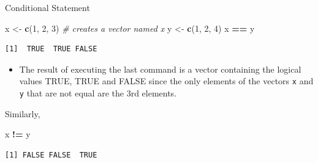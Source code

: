 \documentclass[
  ignorenonframetext,
]{beamer}
\newenvironment{Shaded}{\begin{snugshade}}{\end{snugshade}}
\newcommand{\CommentTok}[1]{\textcolor[rgb]{0.56,0.35,0.01}{\textit{#1}}}
\newcommand{\DecValTok}[1]{\textcolor[rgb]{0.00,0.00,0.81}{#1}}
\newcommand{\FunctionTok}[1]{\textcolor[rgb]{0.13,0.29,0.53}{\textbf{#1}}}
\newcommand{\NormalTok}[1]{#1}
\newcommand{\OtherTok}[1]{\textcolor[rgb]{0.56,0.35,0.01}{#1}}
\newcommand{\SpecialCharTok}[1]{\textcolor[rgb]{0.81,0.36,0.00}{\textbf{#1}}}
\providecommand{\tightlist}{%
  \setlength{\itemsep}{0pt}\setlength{\parskip}{0pt}}
\begin{document}
\begin{frame}[fragile]{Conditional Statement}
\protect\hypertarget{conditional-statement}{}
\small

\begin{Shaded}
\begin{Highlighting}[]
\NormalTok{x }\OtherTok{\textless{}{-}} \FunctionTok{c}\NormalTok{(}\DecValTok{1}\NormalTok{, }\DecValTok{2}\NormalTok{, }\DecValTok{3}\NormalTok{)  }\CommentTok{\# creates a vector named x}
\NormalTok{y }\OtherTok{\textless{}{-}} \FunctionTok{c}\NormalTok{(}\DecValTok{1}\NormalTok{, }\DecValTok{2}\NormalTok{, }\DecValTok{4}\NormalTok{)}
\NormalTok{x }\SpecialCharTok{==}\NormalTok{ y}
\end{Highlighting}
\end{Shaded}

\begin{verbatim}
[1]  TRUE  TRUE FALSE
\end{verbatim}

\normalsize

\begin{itemize}
\tightlist
\item
  The result of executing the last command is a vector containing the
  logical values TRUE, TRUE and FALSE since the only elements of the
  vectors \texttt{x} and \texttt{y} that are not equal are the 3rd
  elements.
\end{itemize}

Similarly,

\small

\begin{Shaded}
\begin{Highlighting}[]
\NormalTok{x }\SpecialCharTok{!=}\NormalTok{ y}
\end{Highlighting}
\end{Shaded}

\begin{verbatim}
[1] FALSE FALSE  TRUE
\end{verbatim}

\normalsize
\end{frame}
\end{document}
